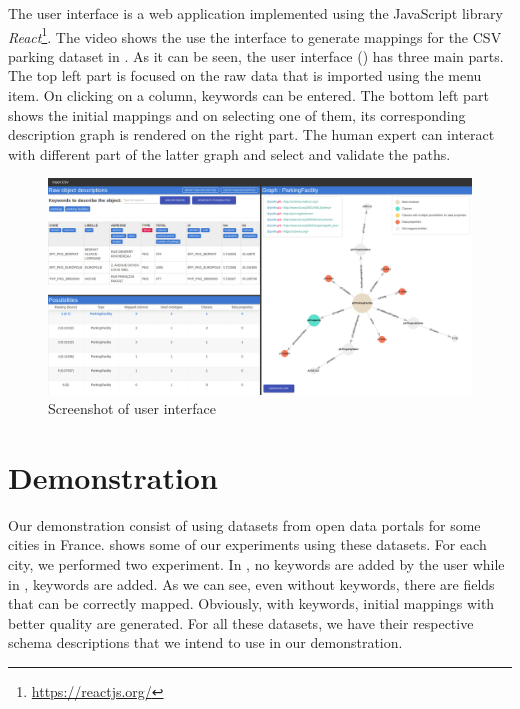 The user interface is a web application implemented using the JavaScript library \emph{React}\footnote{\url{https://reactjs.org/}}. The video shows the use the interface to generate mappings for the CSV parking dataset in . As it can be seen, the user interface () has three main parts. The top left part is focused on the raw data that is imported using the  menu item. On clicking on a column, keywords can be entered. The bottom left part shows the initial mappings and on selecting one of them, its corresponding description graph is rendered on the right part. The human expert can interact with different part of the latter graph and select and validate the paths. 



\begin{figure}[h]
	\centering
	\includegraphics[scale=0.15]{images/global.png}
	\caption{Screenshot of user interface}
	\label{fig:screenshotInterface}
\end{figure}

\section{Demonstration}\label{sec:demonstration}
Our demonstration consist of using datasets from open data portals for some cities in France.  shows some of our experiments using these datasets. For each city, we performed two experiment. In , no keywords are added by the user while in , keywords are added. As we can see, even without keywords, there are fields that can be correctly mapped. Obviously, with keywords, initial mappings with better quality are generated. For all these datasets, we have their respective schema descriptions that we intend to use in our demonstration. 



